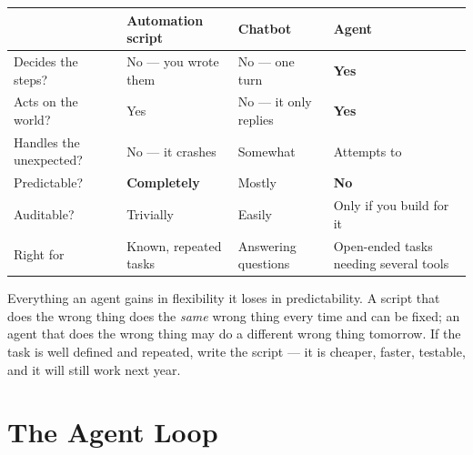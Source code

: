 \begin{longtable}{@{}L{2.9cm}L{3.5cm}L{3.5cm}L{4.2cm}@{}}
\toprule
{}
& \textbf{Automation script} & \textbf{Chatbot} & \textbf{Agent} \\
\midrule
\endhead
Decides the steps? & No --- you wrote them & No --- one turn & \textbf{Yes} \\
Acts on the world? & Yes & No --- it only replies & \textbf{Yes} \\
Handles the unexpected? & No --- it crashes & Somewhat & Attempts to \\
Predictable? & \textbf{Completely} & Mostly & \textbf{No} \\
Auditable? & Trivially & Easily & Only if you build for it \\
Right for & Known, repeated tasks & Answering questions & Open-ended tasks needing several tools \\
\bottomrule
\end{longtable}

\begin{alertbox}
Everything an agent gains in flexibility it loses in predictability. A script that
does the wrong thing does the \emph{same} wrong thing every time and can be fixed;
an agent that does the wrong thing may do a different wrong thing tomorrow. If the
task is well defined and repeated, write the script --- it is cheaper, faster,
testable, and it will still work next year.
\end{alertbox}

\section{The Agent Loop}

